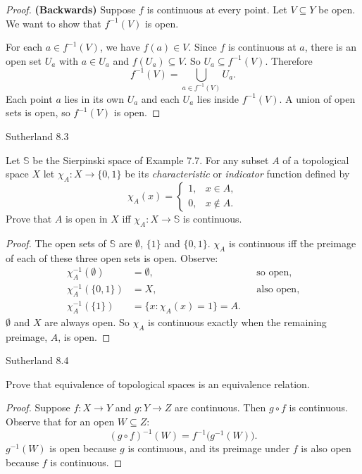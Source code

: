 \documentclass[minion]{homework}
\begin{document}
\begin{problems}
\begin{proof}
\textbf{(Backwards)} Suppose $f$ is continuous at every point. Let $V \subseteq Y$ be open. We want to show that $f^{-1}(V)$ is open.

For each $a \in f^{-1}(V)$, we have $f(a) \in V$. Since $f$ is continuous at $a$, there is an open set $U_a$ with $a \in U_a$ and $f(U_a) \subseteq V$. So $U_a \subseteq f^{-1}(V)$. Therefore
\[
f^{-1}(V) = \bigcup_{a \in f^{-1}(V)} U_a .
\]
Each point $a$ lies in its own $U_a$ and each $U_a$ lies inside $f^{-1}(V)$. A union of open sets is open, so $f^{-1}(V)$ is open.
\end{proof}

\problem Sutherland 8.3

Let $\mathbb{S}$ be the Sierpinski space of Example 7.7. For any subset $A$ of a topological space $X$ let $\chi_A : X \to \{0, 1\}$ be its \emph{characteristic} or \emph{indicator} function defined by
\[
\chi_A(x) =
\begin{cases}
1, & x \in A, \\
0, & x \notin A.
\end{cases}
\]
Prove that $A$ is open in $X$ iff $\chi_A : X \to \mathbb{S}$ is continuous.

\begin{proof}
The open sets of $\mathbb{S}$ are $\emptyset$, $\{1\}$ and $\{0,1\}$. $\chi_A$ is continuous iff the preimage of each of these three open sets is open. Observe:
\begin{align*}
\chi_A^{-1}(\emptyset) &= \emptyset, && \text{so open,} \\
\chi_A^{-1}(\{0,1\}) &= X, && \text{also open,} \\
\chi_A^{-1}(\{1\}) &= \{x : \chi_A(x) = 1\} = A.
\end{align*}
$\emptyset$ and $X$ are always open. So $\chi_A$ is continuous exactly when the remaining preimage, $A$, is open.
\end{proof}

\problem Sutherland 8.4

Prove that equivalence of topological spaces is an equivalence relation.

\begin{proof}
Suppose $f : X \to Y$ and $g : Y \to Z$ are continuous. Then $g \circ f$ is continuous. Observe that for an open $W \subseteq Z$:
\[
(g \circ f)^{-1}(W) = f^{-1}\big(g^{-1}(W)\big).
\]
$g^{-1}(W)$ is open because $g$ is continuous, and its preimage under $f$ is also open because $f$ is continuous.


\end{proof}
\end{problems}
\end{document}
